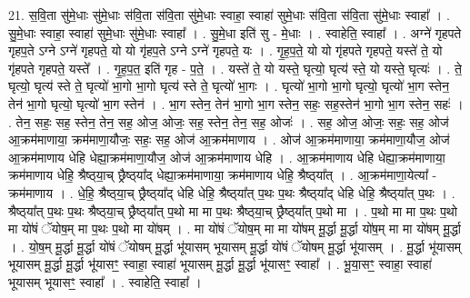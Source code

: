 \documentclass[17pt]{extarticle}
\begin{document}
21. स॒वि॒ता सु॑मे॒धाः सु॑मे॒धाः स॑वि॒ता स॑वि॒ता सु॑मे॒धाः स्वाहा॒ स्वाहा॑ सुमे॒धाः स॑वि॒ता स॑वि॒ता सु॑मे॒धाः स्वाहा᳚ । . सु॒मे॒धाः स्वाहा॒ स्वाहा॑ सुमे॒धाः सु॑मे॒धाः स्वाहा᳚ । . सु॒मे॒धा इति॑ सु - मे॒धाः । . स्वाहेति॒ स्वाहा᳚ । . अग्ने॑ गृहपते गृहप॒ते ऽग्ने ऽग्ने॑ गृहपते॒ यो यो गृ॑हप॒ते ऽग्ने ऽग्ने॑ गृहपते॒ यः । . गृ॒ह॒प॒ते॒ यो यो गृ॑हपते गृहपते॒ यस्ते॑ ते॒ यो गृ॑हपते गृहपते॒ यस्ते᳚ । . गृ॒ह॒प॒त॒ इति॑ गृह - प॒ते॒ । . यस्ते॑ ते॒ यो यस्ते॒ घृत्यो॒ घृत्य॑ स्ते॒ यो यस्ते॒ घृत्यः॑ । . ते॒ घृत्यो॒ घृत्य॑ स्ते ते॒ घृत्यो॑ भा॒गो भा॒गो घृत्य॑ स्ते ते॒ घृत्यो॑ भा॒गः । . घृत्यो॑ भा॒गो भा॒गो घृत्यो॒ घृत्यो॑ भा॒ग स्तेन॒ तेन॑ भा॒गो घृत्यो॒ घृत्यो॑ भा॒ग स्तेन॑ । . भा॒ग स्तेन॒ तेन॑ भा॒गो भा॒ग स्तेन॒ सहः॒ सह॒स्तेन॑ भा॒गो भा॒ग स्तेन॒ सहः॑ । . तेन॒ सहः॒ सह॒ स्तेन॒ तेन॒ सह॒ ओज॒ ओजः॒ सह॒ स्तेन॒ तेन॒ सह॒ ओजः॑ । . सह॒ ओज॒ ओजः॒ सहः॒ सह॒ ओज॑ आ॒क्रम॑माणाया॒ क्रम॑माणा॒यौजः॒ सहः॒ सह॒ ओज॑ आ॒क्रम॑माणाय । . ओज॑ आ॒क्रम॑माणाया॒ क्रम॑माणा॒यौज॒ ओज॑ आ॒क्रम॑माणाय धेहि धेह्या॒क्रम॑माणा॒यौज॒ ओज॑ आ॒क्रम॑माणाय धेहि । . आ॒क्रम॑माणाय धेहि धेह्या॒क्रम॑माणाया॒ क्रम॑माणाय धेहि॒ श्रैष्ठ्‍या॒च् छ्रैष्ठ्‍या᳚द् धेह्या॒क्रम॑माणाया॒ क्रम॑माणाय धेहि॒ श्रैष्ठ्‍या᳚त् । . आ॒क्रम॑माणा॒येत्या᳚ - क्रम॑माणाय । . धे॒हि॒ श्रैष्ठ्‍या॒च् छ्रैष्ठ्‍या᳚द् धेहि धेहि॒ श्रैष्ठ्‍या᳚त् प॒थः प॒थः श्रैष्ठ्‍या᳚द् धेहि धेहि॒ श्रैष्ठ्‍या᳚त् प॒थः । . श्रैष्ठ्‍या᳚त् प॒थः प॒थः श्रैष्ठ्‍या॒च् छ्रैष्ठ्‍या᳚त् प॒थो मा मा प॒थः श्रैष्ठ्‍या॒च् छ्रैष्ठ्‍या᳚त् प॒थो मा । . प॒थो मा मा प॒थः प॒थो मा यो॑षं ॅयोष॒म् मा प॒थः प॒थो मा यो॑षम् । . मा यो॑षं ॅयोष॒म् मा मा यो॑षम् मू॒र्द्धा मू॒र्द्धा यो॑ष॒म् मा मा यो॑षम् मू॒र्द्धा । . यो॒ष॒म् मू॒र्द्धा मू॒र्द्धा यो॑षं ॅयोषम् मू॒र्द्धा भू॑यासम् भूयासम् मू॒र्द्धा यो॑षं ॅयोषम् मू॒र्द्धा भू॑यासम् । . मू॒र्द्धा भू॑यासम् भूयासम् मू॒र्द्धा मू॒र्द्धा भू॑यासꣳ॒॒ स्वाहा॒ स्वाहा॑ भूयासम् मू॒र्द्धा मू॒र्द्धा भू॑यासꣳ॒॒ स्वाहा᳚ । . भू॒या॒सꣳ॒॒ स्वाहा॒ स्वाहा॑ भूयासम् भूयासꣳ॒॒ स्वाहा᳚ । . स्वाहेति॒ स्वाहा᳚ । \newline
\pagebreak
{}
\end{document}
